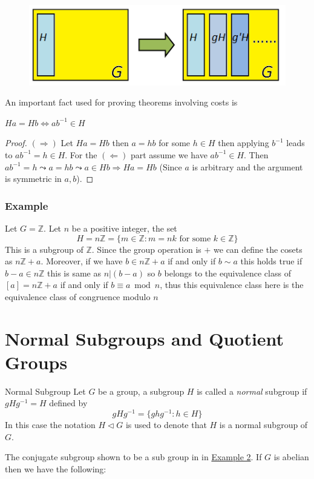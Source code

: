 \documentclass[16pt,a4paper]{article}
\theoremstyle{definition}
\begin{document}
\begin{figure}[hbtp]
\centering
\includegraphics[scale=1]{figs/fig4.png}
\end{figure}
An important fact used for proving theorems involving costs is 

\begin{prop}{}{}
$Ha=Hb\iff ab^{-1}\in H$ 
\end{prop} 
\begin{proof}
$(\Rightarrow)$ Let $Ha=Hb$ then $a=hb$ for some $h\in H$ then applying $b^{-1}$ leads to $ab^{-1}=h\in H$. For the $(\Leftarrow)$ part assume we have $ab^{-1}\in H$. Then $ab^{-1}=h\leadsto a=hb \leadsto a\in Hb \Rightarrow Ha=Hb$ (Since $a$ is arbitrary and the argument is symmetric in $a,b$).
\end{proof}

\subsubsection*{Example}
 Let $G= \mathbb{Z}$. Let $n$ be a positive integer, the set 
 \[H=n\mathbb{Z} = \{m\in \mathbb{Z} : m=nk \text{ for some $k\in \mathbb{Z}$}\}\]
This is a subgroup of $\mathbb{Z}$. Since the group operation is $+$ we can define the cosets as $n\mathbb{Z} + a$. Moreover, if we have $b\in n\mathbb{Z}+a$ if and only if $b\sim a$ this holds true if $b-a\in n\mathbb{Z}$ this is same as $n|(b-a)$ so $b$ belongs to the equivalence class of $[a] = n\mathbb{Z}+a$ if and only if $b\equiv a\bmod n$, thus this equivalence class here is the equivalence class of congruence modulo $n$ 


\section{Normal Subgroups and Quotient Groups}
\begin{defn}{Normal Subgroup}{}
Let $G$ be a group, a subgroup $H$ is called a \emph{normal} subgroup if $gHg^{-1}=H$ defined by 
\[gHg^{-1} = \{ghg^{-1} : h \in H\}\]
In this case the notation $H\lhd G$ is used to denote that $H$ is a normal subgroup of $G$. 
\end{defn}
The conjugate subgroup shown to be a sub group in in \hyperref[cong]{Example 2}. If $G$ is abelian then we have the following: 
\end{document}

